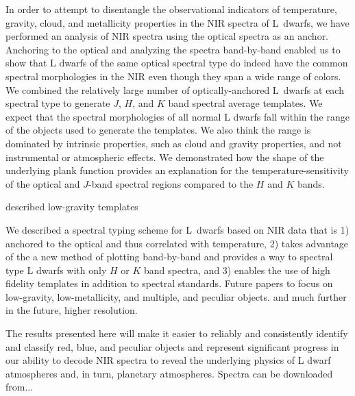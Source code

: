\documentclass[12pt,preprint]{aastex}
\begin{document}
In order to attempt to disentangle the observational indicators of temperature, gravity, cloud, and metallicity properties in the NIR spectra of L~dwarfs, we have performed an analysis of NIR spectra using the optical spectra as an anchor.
Anchoring to the optical and analyzing the spectra band-by-band enabled us to show that L dwarfs of the same optical spectral type do indeed have the common spectral morphologies in the NIR even though they span a wide range of colors.
We combined the relatively large number of optically-anchored L~dwarfs at each spectral type to generate $J$, $H$, and $K$ band spectral average templates. We expect that the spectral morphologies of all normal L dwarfs fall within the range of the objects used to generate the templates. We also think the range is dominated by intrinsic properties, such as cloud and gravity properties, and not instrumental or atmospheric effects.
We demonstrated how the shape of the underlying plank function provides an explanation for the temperature-sensitivity of the optical and $J$-band spectral regions compared to the $H$ and $K$ bands.

described low-gravity templates



We described a spectral typing scheme for L~dwarfs based on NIR data that is 1) anchored to the optical and thus correlated with temperature, 2) takes advantage of the a new method of plotting band-by-band and provides a way to spectral type L dwarfs with only $H$ or $K$ band spectra, and 3) enables the use of high fidelity templates in addition to spectral standards.
Future papers to focus on low-gravity, low-metallicity, and multiple, and peculiar objects. and much further in the future, higher resolution.

The results presented here will make it easier to reliably and consistently identify and classify red, blue, and peculiar objects and represent significant progress in our ability to decode NIR spectra to reveal the underlying physics of L dwarf atmospheres and, in turn, planetary atmospheres.
Spectra can be downloaded from...
\end{document}
